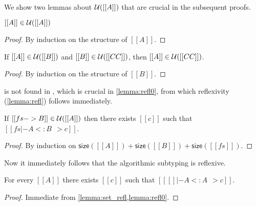 We show two lemmas about $\mathcal{U}([[A]])$ that are crucial in the subsequent proofs.

\begin{lemma} \label{lemma:set_refl}
  $[[A]] \in \mathcal{U}([[A]])$
\end{lemma}
\begin{proof}
  By induction on the structure of $[[A]]$.
\end{proof}

\begin{lemma} \label{lemma:set_trans}
  If $[[A]] \in \mathcal{U}([[B]])$ and $[[B]] \in \mathcal{U}([[CC]])$, then $[[A]] \in \mathcal{U}([[CC]])$.
\end{lemma}
\begin{proof}
  By induction on the structure of $[[B]]$.
\end{proof}

\begin{remark}
   is not found in \cite{pierce1989decision}, which is
  crucial in \cref{lemma:refl0}, from which reflexivity (\cref{lemma:refl})
  follows immediately.
\end{remark}


\begin{lemma} \label{lemma:refl0}
  If $[[fs -> B]] \in \mathcal{U}([[A]])$ then there exists $[[c]]$ such that $[[fs |- A <: B ~~> c]]$.
\end{lemma}
\begin{proof}
  By induction on $\mathsf{size}([[A]]) + \mathsf{size}([[B]]) + \mathsf{size}([[fs]])$.
\end{proof}

Now it immediately follows that the algorithmic subtyping is reflexive.

\begin{lemma}[Reflexivity] \label{lemma:refl}
  For every $[[A]]$ there exists $[[c]]$ such that $[[ [] |- A <: A ~~> c]]$.
\end{lemma}
\begin{proof}
  Immediate from \cref{lemma:set_refl,lemma:refl0}.
\end{proof}

